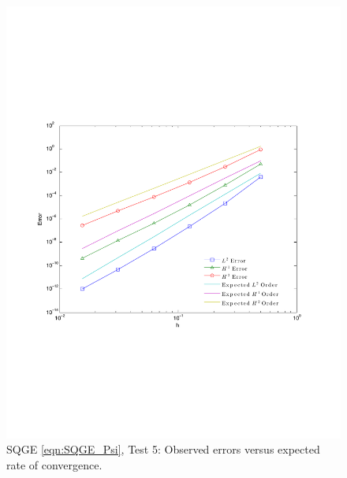 \begin{figure}
  \begin{center}
    \includegraphics[scale=0.5]{Figures/SQGEsin2Convergence.pdf}
    \caption{SQGE \eqref{eqn:SQGE_Psi}, Test 5: Observed errors versus expected
      rate of convergence.}
    \label{fig:SQGEsinErrors}
  \end{center}
\end{figure}

